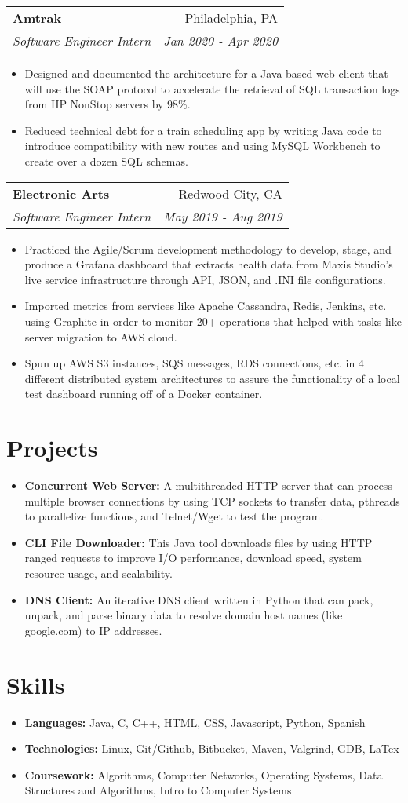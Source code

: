 \documentclass[letterpaper,11pt]{article}
\makeatletter
\newcommand{\resumeItem}[2]{
  \item\small{
    \textbf{#1}{#2 \vspace{-7pt}}
  }
}
\newcommand{\resumeSubheading}[4]{
  \vspace{-1pt}\item
    \begin{tabular*}{0.97\textwidth}{l@{\extracolsep{\fill}}r}
      \textbf{#1} & #2 \\
      \textit{\small#3} & \textit{\small #4} \\
    \end{tabular*}\vspace{-5pt}
}
\newcommand{\resumeSubItem}[2]{\resumeItem{#1}{#2}\vspace{-2pt}}
\newcommand{\resumeSubHeadingListStart}{\begin{itemize}[leftmargin=*]}
\newcommand{\resumeSubHeadingListEnd}{\end{itemize}}
\newcommand{\resumeItemListStart}{\begin{itemize}}
\newcommand{\resumeItemListEnd}{\end{itemize}\vspace{-5pt}}
\makeatother
\begin{document}
    \resumeSubheading
      {Amtrak}{Philadelphia, PA}
      {Software Engineer Intern}{Jan 2020 - Apr 2020}
      \resumeItemListStart
        \resumeItem{}
          {Designed and documented the architecture for a Java-based web client that will use the SOAP protocol to accelerate the retrieval of SQL transaction logs from HP NonStop servers by 98\%.}
        \resumeItem{}
          {Reduced technical debt for a train scheduling app by writing Java code to introduce compatibility with new routes and using MySQL Workbench to create over a dozen SQL schemas.}
      \resumeItemListEnd
      
    \resumeSubheading
      {Electronic Arts}{Redwood City, CA}
      {Software Engineer Intern}{May 2019 - Aug 2019}
      \resumeItemListStart
        \resumeItem{}
          {Practiced the Agile/Scrum development methodology to develop, stage, and produce a Grafana dashboard that extracts health data from Maxis Studio's live service infrastructure through API, JSON, and .INI file configurations.}
        \resumeItem{}
          {Imported metrics from services like Apache Cassandra, Redis, Jenkins, etc. using Graphite in order to monitor 20+ operations that helped with tasks like server migration to AWS cloud.}
        \resumeItem{}
          {Spun up AWS S3 instances, SQS messages, RDS connections, etc. in 4 different distributed system architectures to assure the functionality of a local test dashboard running off of a Docker container.}
      \resumeItemListEnd



\section{Projects}
  \resumeSubHeadingListStart
    \resumeSubItem{Concurrent Web Server: }
      {A multithreaded HTTP server that can process multiple browser connections by using TCP sockets to transfer data, pthreads to parallelize functions, and Telnet/Wget to test the program.}
    \resumeSubItem{CLI File Downloader: }
      {This Java tool downloads files by using HTTP ranged requests to improve I/O performance, download speed, system resource usage, and scalability.}
    \resumeSubItem{DNS Client: }
      {An iterative DNS client written in Python that can pack, unpack, and parse binary data to
resolve domain host names (like google.com) to IP addresses.}
  \resumeSubHeadingListEnd

%
\section{Skills}
 \resumeSubHeadingListStart
     \resumeSubItem{Languages: }
      {Java, C, C++, HTML, CSS, Javascript, Python, Spanish}
    \resumeSubItem{Technologies: }
      {Linux, Git/Github, Bitbucket, Maven, Valgrind, GDB, LaTex}
    \resumeSubItem{Coursework: }
      {Algorithms, Computer Networks, Operating Systems, Data Structures and Algorithms, Intro to Computer Systems}
 \resumeSubHeadingListEnd


\end{document}

